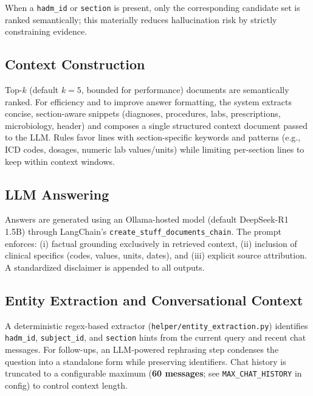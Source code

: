 When a \texttt{hadm\_id} or \texttt{section} is present, only the corresponding candidate set is ranked semantically; this materially reduces hallucination risk by strictly constraining evidence.

\subsection{Context Construction}
Top-$k$ (default \(k=5\), bounded for performance) documents are semantically ranked. For efficiency and to improve answer formatting, the system extracts concise, section-aware snippets (diagnoses, procedures, labs, prescriptions, microbiology, header) and composes a single structured context document passed to the LLM. Rules favor lines with section-specific keywords and patterns (e.g., ICD codes, dosages, numeric lab values/units) while limiting per-section lines to keep within context windows.

\subsection{LLM Answering}
Answers are generated using an Ollama-hosted model (default DeepSeek-R1 1.5B) through LangChain's \texttt{create\_stuff\_documents\_chain}. The prompt enforces: (i) factual grounding exclusively in retrieved context, (ii) inclusion of clinical specifics (codes, values, units, dates), and (iii) explicit source attribution. A standardized disclaimer is appended to all outputs.

\subsection{Entity Extraction and Conversational Context}
A deterministic regex-based extractor (\texttt{helper/entity\_extraction.py}) identifies \texttt{hadm\_id}, \texttt{subject\_id}, and \texttt{section} hints from the current query and recent chat messages. For follow-ups, an LLM-powered rephrasing step condenses the question into a standalone form while preserving identifiers. Chat history is truncated to a configurable maximum (\textbf{60 messages}; see \texttt{MAX\_CHAT\_HISTORY} in config) to control context length.

